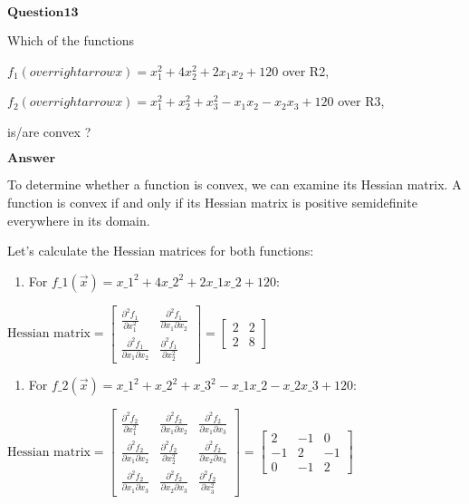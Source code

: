 \documentclass[11pt]{article}
\providecommand{\tightlist}{%
      \setlength{\itemsep}{0pt}\setlength{\parskip}{0pt}}
\begin{document}
    $\textbf{Question13}$

Which of the functions

$f_1(overrightarrow{x})=x^2_1+4x^2_2+2x_1x_2+120$ over R2,

$f_2(overrightarrow{x})=x^2_1+x^2_2+x^2_3-x_1x_2-x_2x_3+120$ over R3,

is/are convex ?

$\textbf{Answer}$

    To determine whether a function is convex, we can examine its Hessian
matrix. A function is convex if and only if its Hessian matrix is
positive semidefinite everywhere in its domain.

Let's calculate the Hessian matrices for both functions:

\begin{enumerate}
\def\labelenumi{\arabic{enumi}.}
\tightlist
\item
  For $ f\_1(\vec{x}) = x\_1^2 + 4x\_2^2 + 2x\_1x\_2 + 120 $:
\end{enumerate}

$ \text{Hessian matrix} =\begin{bmatrix}\frac{\partial^2 f_1}{\partial x_1^2} & \frac{\partial^2 f_1}{\partial x_1 \partial x_2} \\\frac{\partial^2 f_1}{\partial x_1 \partial x_2} & \frac{\partial^2 f_1}{\partial x_2^2}\end{bmatrix}=\begin{bmatrix}2 & 2 \\2 & 8\end{bmatrix}$

\begin{enumerate}
\def\labelenumi{\arabic{enumi}.}
\setcounter{enumi}{1}
\tightlist
\item
  For $ f\_2(\vec{x}) = x\_1^2 + x\_2^2 + x\_3^2 - x\_1x\_2 -
  x\_2x\_3 + 120 $:
\end{enumerate}

$ \text{Hessian matrix} =
\begin{bmatrix}
\frac{\partial^2 f_2}{\partial x_1^2} & \frac{\partial^2 f_2}{\partial x_1 \partial x_2} & \frac{\partial^2 f_2}{\partial x_1 \partial x_3} \\
\frac{\partial^2 f_2}{\partial x_1 \partial x_2} & \frac{\partial^2 f_2}{\partial x_2^2} & \frac{\partial^2 f_2}{\partial x_2 \partial x_3} \\
\frac{\partial^2 f_2}{\partial x_1 \partial x_3} & \frac{\partial^2 f_2}{\partial x_2 \partial x_3} & \frac{\partial^2 f_2}{\partial x_3^2}
\end{bmatrix}
=
\begin{bmatrix}
2 & -1 & 0 \\
-1 & 2 & -1 \\
0 & -1 & 2
\end{bmatrix}
$
\end{document}
